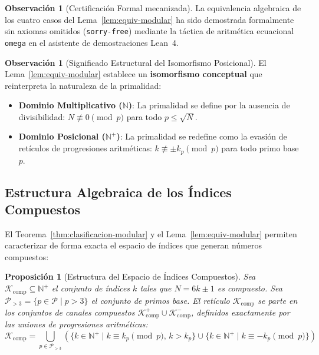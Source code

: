 \documentclass{article}
\numberwithin{equation}{section}
\theoremstyle{plain}
\newtheorem{proposition}[theorem]{Proposición}
\theoremstyle{definition}
\newtheorem{remark}[theorem]{Observación}
\begin{document}
\begin{remark}[Certificación Formal mecanizada]
\label{rem:certificacion-lema-31}
La equivalencia algebraica de los cuatro casos del Lema~\ref{lem:equiv-modular} ha sido demostrada formalmente sin axiomas omitidos (\texttt{sorry-free}) mediante la táctica de aritmética ecuacional \texttt{omega} en el asistente de demostraciones Lean~4.
\end{remark}

\begin{remark}[Significado Estructural del Isomorfismo Posicional]
\label{rem:significado-estructural}
El Lema~\ref{lem:equiv-modular} establece un \textbf{isomorfismo conceptual} que reinterpreta la naturaleza de la primalidad:
\begin{itemize}
    \item \textbf{Dominio Multiplicativo ($\mathbb{N}$)}: La primalidad se define por la ausencia de divisibilidad: $N \not\equiv 0 \pmod p$ para todo $p \le \sqrt{N}$.
    \item \textbf{Dominio Posicional ($\mathbb{N}^+$)}: La primalidad se redefine como la evasión de retículos de progresiones aritméticas: $k \not\equiv \pm k_p \pmod p$ para todo primo base $p$.
\end{itemize}
\end{remark}

\subsection{Estructura Algebraica de los Índices Compuestos}

El Teorema~\ref{thm:clasificacion-modular} y el Lema~\ref{lem:equiv-modular} permiten caracterizar de forma exacta el espacio de índices que generan números compuestos:

\begin{proposition}[Estructura del Espacio de Índices Compuestos]
\label{prop:estructura-compuesta}
Sea $\mathcal{K}_{\text{comp}} \subseteq \mathbb{N}^+$ el conjunto de índices $k$ tales que $N = 6k \pm 1$ es compuesto. Sea $\mathcal{P}_{>3} = \{p \in \mathcal{P} \mid p > 3\}$ el conjunto de primos base. El retículo $\mathcal{K}_{\text{comp}}$ se parte en los conjuntos de canales compuestos $\mathcal{K}_{\text{comp}}^+ \cup \mathcal{K}_{\text{comp}}^-$, definidos exactamente por las uniones de progresiones aritméticas:
\begin{equation}
\mathcal{K}_{\text{comp}} = \bigcup_{p \in \mathcal{P}_{>3}} \left( \{k \in \mathbb{N}^+ \mid k \equiv k_p \pmod p,\, k > k_p \} \cup \{k \in \mathbb{N}^+ \mid k \equiv -k_p \pmod p \} \right)
\end{equation}
\end{proposition}
\end{document}
